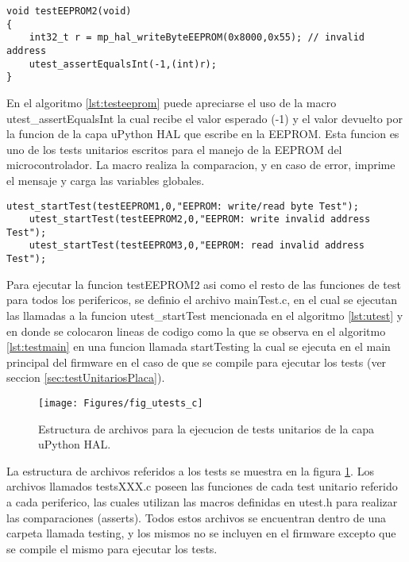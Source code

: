 \begin{lstlisting}[label={lst:testeeprom},caption=Ejemplo de un test unitario para la EEPROM usando una direccion invalida.]
void testEEPROM2(void)
{
	int32_t r = mp_hal_writeByteEEPROM(0x8000,0x55); // invalid address
	utest_assertEqualsInt(-1,(int)r);
}
\end{lstlisting}

En el algoritmo \ref{lst:testeeprom} puede apreciarse el uso de la macro utest\_assertEqualsInt la cual recibe el valor esperado (-1) y el valor devuelto por la funcion de la capa uPython HAL que escribe en la EEPROM. Esta funcion es uno de los tests unitarios escritos para el manejo de la EEPROM del microcontrolador. La macro realiza la comparacion, y en caso de error, imprime el mensaje y carga las variables globales.

\begin{lstlisting}[label={lst:testmain},caption=Ejemplo de ejecucion de funciones de test en archivo mainTest.c.]
	utest_startTest(testEEPROM1,0,"EEPROM: write/read byte Test");
	utest_startTest(testEEPROM2,0,"EEPROM: write invalid address Test");
	utest_startTest(testEEPROM3,0,"EEPROM: read invalid address Test");
\end{lstlisting}

Para ejecutar la funcion testEEPROM2 asi como el resto de las funciones de test para todos los perifericos, se definio el archivo mainTest.c, en el cual se ejecutan las llamadas a la funcion utest\_startTest mencionada en el algoritmo \ref{lst:utest} y en donde se colocaron lineas de codigo como la que se observa en el algoritmo \ref{lst:testmain} en una funcion llamada startTesting la cual se ejecuta en el main principal del firmware en el caso de que se compile para ejecutar los tests (ver seccion \ref{sec:testUnitariosPlaca}).

\begin{figure}[ht]
  \centering
    \texttt{[image: Figures/fig\_utests\_c]}
  \caption{Estructura de archivos para la ejecucion de tests unitarios de la capa uPython HAL.}
  \label{fig:utestcarq}
\end{figure}

La estructura de archivos referidos a los tests se muestra en la figura \ref{fig:utestcarq}. Los archivos llamados testsXXX.c poseen las funciones de cada test unitario referido a cada periferico, las cuales utilizan las macros definidas en utest.h para realizar las comparaciones (asserts). Todos estos archivos se encuentran dentro de una carpeta llamada testing, y los mismos no se incluyen en el firmware excepto que se compile el mismo para ejecutar los tests.

